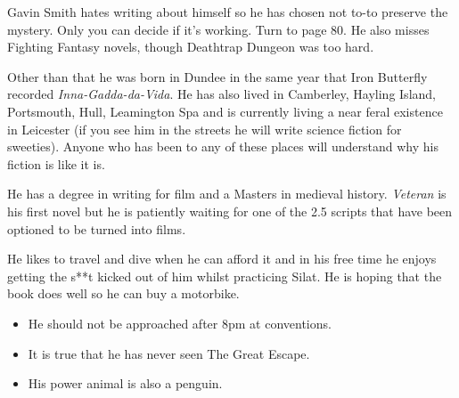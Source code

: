 Gavin Smith hates writing about himself so he has chosen not to-to preserve the mystery. Only you can decide if it’s working. Turn to page 80. He also misses Fighting Fantasy novels, though Deathtrap Dungeon was too hard.

Other than that he was born in Dundee in the same year that Iron Butterfly recorded \emph{Inna-Gadda-da-Vida}. He has also lived in Camberley, Hayling Island, Portsmouth, Hull, Leamington Spa and is currently living a near feral existence in Leicester (if you see him in the streets he will write science fiction for sweeties). Anyone who has been to any of these places will understand why his fiction is like it is.

He has a degree in writing for film and a Masters in medieval history. \emph{Veteran} is his first novel but he is patiently waiting for one of the 2.5 scripts that have been optioned to be turned into films.

He likes to travel and dive when he can afford it and in his free time he enjoys getting the s**t kicked out of him whilst practicing Silat. He is hoping that the book does well so he can buy a motorbike.

\begin{itemize}[itemsep=-0.8\baselineskip]
\item He should not be approached after 8pm at conventions.
\item It is true that he has never seen The Great Escape.
\item His power animal is also a penguin.
\end{itemize}

